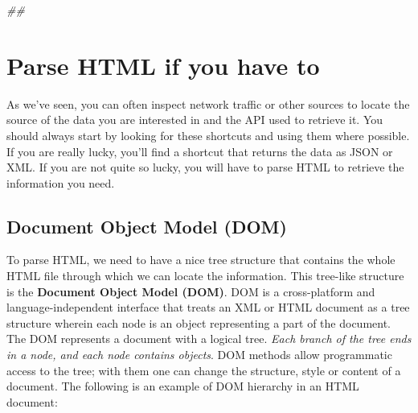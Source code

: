 \documentclass[]{book}
\newenvironment{Shaded}{\begin{snugshade}}{\end{snugshade}}
\newcommand{\CommentTok}[1]{\textcolor[rgb]{0.56,0.35,0.01}{\textit{#1}}}
\begin{document}
\begin{Shaded}
\begin{Highlighting}[]
\CommentTok{##}
\end{Highlighting}
\end{Shaded}

\section{Parse HTML if you have to}\label{parse-html-if-you-have-to}

As we've seen, you can often inspect network traffic or other sources to
locate the source of the data you are interested in and the API used to
retrieve it. You should always start by looking for these shortcuts and
using them where possible. If you are really lucky, you'll find a
shortcut that returns the data as JSON or XML. If you are not quite so
lucky, you will have to parse HTML to retrieve the information you need.

\subsection{Document Object Model
(DOM)}\label{document-object-model-dom}

To parse HTML, we need to have a nice tree structure that contains the
whole HTML file through which we can locate the information. This
tree-like structure is the \textbf{Document Object Model (DOM)}. DOM is
a cross-platform and language-independent interface that treats an XML
or HTML document as a tree structure wherein each node is an object
representing a part of the document. The DOM represents a document with
a logical tree. \emph{Each branch of the tree ends in a node, and each
node contains objects}. DOM methods allow programmatic access to the
tree; with them one can change the structure, style or content of a
document. The following is an example of DOM hierarchy in an HTML
document:
\end{document}
